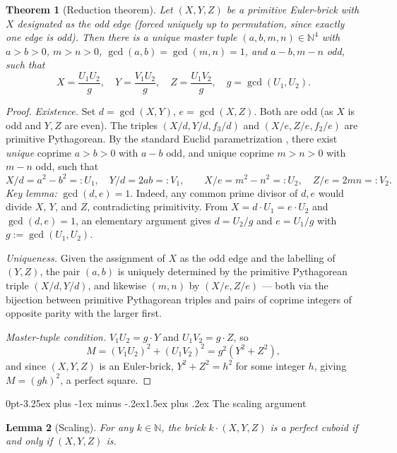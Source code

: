 \documentclass[12pt,a4paper,reqno]{amsart}
\makeatletter
\renewcommand{\subsection}{\@startsection{subsection}{2}%
  {0pt}{-3.25ex plus -1ex minus -.2ex}{1.5ex plus .2ex}%
  {\normalfont\normalsize\bfseries}}
\theoremstyle{plain}
\newtheorem{theorem}{Theorem}[section]
\newtheorem{lemma}[theorem]{Lemma}
\theoremstyle{definition}
\theoremstyle{remark}
\newcommand{\N}{\mathbb{N}}
\makeatother
\begin{document}
\begin{theorem}[Reduction theorem]
\label{thm:reduction}
Let $(X, Y, Z)$ be a primitive Euler-brick with $X$ designated as the odd edge (forced uniquely up to permutation, since exactly one edge is odd). Then there is a unique master tuple $(a, b, m, n) \in \N^4$ with $a > b > 0$, $m > n > 0$, $\gcd(a,b) = \gcd(m,n) = 1$, and $a-b, m-n$ odd, such that
$$
X = \frac{U_1 U_2}{g}, \quad Y = \frac{V_1 U_2}{g}, \quad Z = \frac{U_1 V_2}{g}, \quad
g = \gcd(U_1, U_2).
$$
\end{theorem}

\begin{proof}
\emph{Existence.} Set $d = \gcd(X, Y)$, $e = \gcd(X, Z)$. Both are odd (as $X$ is odd and $Y, Z$ are even). The triples
$(X/d, Y/d, f_3/d)$ and $(X/e, Z/e, f_2/e)$ are primitive Pythagorean. By the standard Euclid parametrization \cite[\S 1]{silverman}, there exist \emph{unique} coprime $a > b > 0$ with $a-b$ odd, and unique coprime $m > n > 0$ with $m-n$ odd, such that
$$
X/d = a^2 - b^2 =: U_1, \quad Y/d = 2ab =: V_1,
\qquad X/e = m^2 - n^2 =: U_2, \quad Z/e = 2mn =: V_2.
$$
\textit{Key lemma:} $\gcd(d, e) = 1$. Indeed, any common prime divisor of $d, e$ would divide $X$, $Y$, and $Z$, contradicting primitivity. From $X = d \cdot U_1 = e \cdot U_2$ and $\gcd(d, e) = 1$, an elementary argument gives $d = U_2/g$ and $e = U_1/g$ with $g := \gcd(U_1, U_2)$.

\emph{Uniqueness.} Given the assignment of $X$ as the odd edge and the labelling of $(Y, Z)$, the pair $(a, b)$ is uniquely determined by the primitive Pythagorean triple $(X/d, Y/d)$, and likewise $(m, n)$ by $(X/e, Z/e)$ — both via the bijection between primitive Pythagorean triples and pairs of coprime integers of opposite parity with the larger first.

\emph{Master-tuple condition.} $V_1 U_2 = g \cdot Y$ and $U_1 V_2 = g \cdot Z$, so
$$
M = (V_1 U_2)^2 + (U_1 V_2)^2 = g^2(Y^2 + Z^2),
$$
and since $(X, Y, Z)$ is an Euler-brick, $Y^2 + Z^2 = h^2$ for some integer $h$, giving $M = (gh)^2$, a perfect square.
\end{proof}

\subsection{The scaling argument}

\begin{lemma}[Scaling]
\label{lem:scaling}
For any $k \in \N$, the brick $k \cdot (X, Y, Z)$ is a perfect cuboid if and only if $(X, Y, Z)$ is.
\end{lemma}
\end{document}
